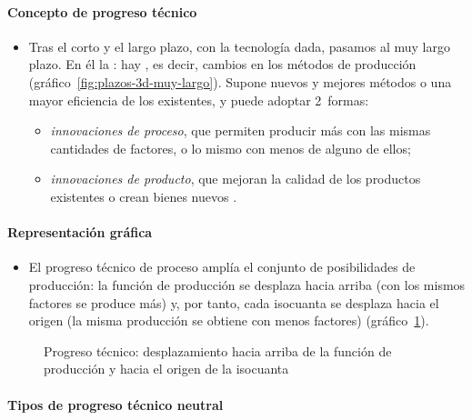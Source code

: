 \documentclass[11pt]{article}
\begin{document}
\paragraph{Concepto de progreso técnico}

\begin{itemize}
\item Tras el corto y el largo plazo, con la tecnología dada, pasamos al muy largo plazo. En él la : hay , es decir, cambios en los métodos de producción (gráfico~\ref{fig:plazos-3d-muy-largo}). Supone nuevos y mejores métodos o una mayor eficiencia de los existentes, y puede adoptar 2~formas:
  \begin{itemize}
  \item \emph{innovaciones de proceso}, que permiten producir más con las mismas cantidades de factores, o lo mismo con menos de alguno de ellos;
  \item \emph{innovaciones de producto}, que mejoran la calidad de los productos existentes o crean bienes nuevos .
  \end{itemize}
\end{itemize}

\paragraph{Representación gráfica}

\begin{itemize}
\item El progreso técnico de proceso amplía el conjunto de posibilidades de producción: la función de producción se desplaza hacia arriba (con los mismos factores se produce más) y, por tanto, cada isocuanta se desplaza hacia el origen (la misma producción se obtiene con menos factores) (gráfico~\ref{fig:progreso-tecnico}).
\end{itemize}

\begin{figure}[H]
\centering
\caption{Progreso técnico: desplazamiento hacia arriba de la función de producción y hacia el origen de la isocuanta}\label{fig:progreso-tecnico}
\end{figure}

\paragraph{Tipos de progreso técnico neutral}
\end{document}
